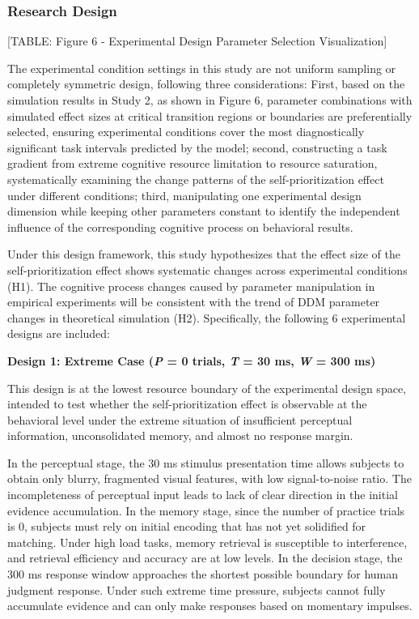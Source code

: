 \documentclass[
  english,
  man,floatsintext]{apa6}
\begin{document}
\subsubsection{Research Design}\label{research-design}

{[}TABLE: Figure 6 - Experimental Design Parameter Selection Visualization{]}

The experimental condition settings in this study are not uniform sampling or completely symmetric design, following three considerations: First, based on the simulation results in Study 2, as shown in Figure 6, parameter combinations with simulated effect sizes at critical transition regions or boundaries are preferentially selected, ensuring experimental conditions cover the most diagnostically significant task intervals predicted by the model; second, constructing a task gradient from extreme cognitive resource limitation to resource saturation, systematically examining the change patterns of the self-prioritization effect under different conditions; third, manipulating one experimental design dimension while keeping other parameters constant to identify the independent influence of the corresponding cognitive process on behavioral results.

Under this design framework, this study hypothesizes that the effect size of the self-prioritization effect shows systematic changes across experimental conditions (H1). The cognitive process changes caused by parameter manipulation in empirical experiments will be consistent with the trend of DDM parameter changes in theoretical simulation (H2). Specifically, the following 6 experimental designs are included:

\textbf{Design 1: Extreme Case (\emph{P} = 0 trials, \emph{T} = 30 ms, \emph{W} = 300 ms)}

This design is at the lowest resource boundary of the experimental design space, intended to test whether the self-prioritization effect is observable at the behavioral level under the extreme situation of insufficient perceptual information, unconsolidated memory, and almost no response margin.

In the perceptual stage, the 30 ms stimulus presentation time allows subjects to obtain only blurry, fragmented visual features, with low signal-to-noise ratio. The incompleteness of perceptual input leads to lack of clear direction in the initial evidence accumulation. In the memory stage, since the number of practice trials is 0, subjects must rely on initial encoding that has not yet solidified for matching. Under high load tasks, memory retrieval is susceptible to interference, and retrieval efficiency and accuracy are at low levels. In the decision stage, the 300 ms response window approaches the shortest possible boundary for human judgment response. Under such extreme time pressure, subjects cannot fully accumulate evidence and can only make responses based on momentary impulses.
\end{document}
